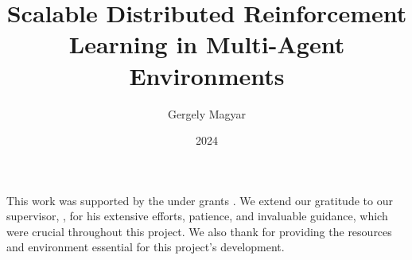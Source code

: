 \documentclass[
]{classes/TDK_en}[2023/04/10]
\title{Scalable Distributed Reinforcement Learning in Multi-Agent Environments}
\date{2024}
\author{Gergely Magyar}
\affiliation{Associate Professor\protect\\Department of Artificial Intelligence\protect\\Faculty of Informatics}
\begin{document}


\cleardoublepage
\maketitle

\hypersetup{linkcolor=black}
\tableofcontents
\hypersetup{linkcolor=deepblue}
\cleardoublepage


\cleardoublepage


\cleardoublepage


\cleardoublepage


\cleardoublepage


\cleardoublepage


\cleardoublepage

\chapter*{\acklabel}

\noindent This work was supported by the  under grants . We extend our gratitude to our supervisor, , for his extensive efforts, patience, and invaluable guidance, which were crucial throughout this project. We also thank  for providing the resources and environment essential for this project's development.

\appendix



\cleardoublepage

{}
\printbibliography[title=\biblabel]
\cleardoublepage

{}
\listoffigures
\cleardoublepage

{}
\listoftables
\cleardoublepage

{}
\listofalgorithms
\cleardoublepage


\printnomenclature

\cleardoublepage

\end{document}

